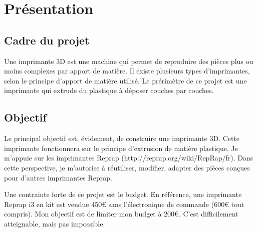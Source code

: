 \section{Présentation}
\subsection{Cadre du projet}
Une imprimante 3D est une machine qui permet de reproduire des pièces %
plus ou moins complexes par apport de matière. Il existe plusieurs types %
d'imprimantes, selon le principe d'apport de matière utilisé. Le prérimètre %
de ce projet est une imprimante qui extrude du plastique à déposer couches %
par couches.
\subsection{Objectif}
Le principal objectif est, évidement, de construire une imprimante 3D. Cette %
imprimante fonctionnera sur le principe d'extrusion de matière plastique. Je %
m'appuie sur les imprimantes Reprap (http://reprap.org/wiki/RepRap/fr). Dans %
cette perspective, je m'autorise à réutiliser, modifier, adapter des pièces %
conçues pour d'autres imprimantes Reprap. \par
Une contrainte forte de ce projet est le budget. En référence, une imprimante %
Reprap i3 en kit est vendue 450€ sans l'électronique de commande (600€ tout %
compris). Mon objectif est de limiter mon budget à 200€. C'est difficilement %
atteignable, mais pas impossible.